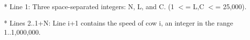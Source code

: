 * Line 1: Three space-separated integers: N, L, and C.  (1 $<$= L,C $<$=         25,000).

* Lines 2..1+N: Line i+1 contains the speed of cow i, an integer in         the range 1..1,000,000.